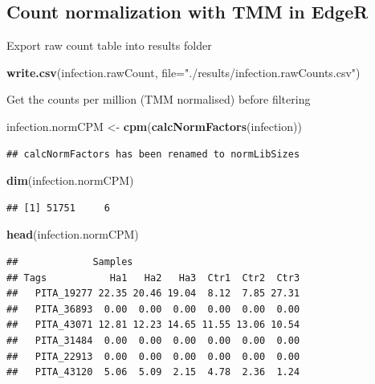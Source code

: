 \documentclass[
]{article}
\newenvironment{Shaded}{\begin{snugshade}}{\end{snugshade}}
\newcommand{\AttributeTok}[1]{\textcolor[rgb]{0.13,0.29,0.53}{#1}}
\newcommand{\FunctionTok}[1]{\textcolor[rgb]{0.13,0.29,0.53}{\textbf{#1}}}
\newcommand{\NormalTok}[1]{#1}
\newcommand{\OtherTok}[1]{\textcolor[rgb]{0.56,0.35,0.01}{#1}}
\newcommand{\StringTok}[1]{\textcolor[rgb]{0.31,0.60,0.02}{#1}}
\begin{document}
\subsection{Count normalization with TMM in
EdgeR}\label{count-normalization-with-tmm-in-edger}

Export raw count table into results folder

\begin{Shaded}
\begin{Highlighting}[]
\FunctionTok{write.csv}\NormalTok{(infection.rawCount, }\AttributeTok{file=}\StringTok{"./results/infection.rawCounts.csv"}\NormalTok{)}
\end{Highlighting}
\end{Shaded}

Get the counts per million (TMM normalised) before filtering

\begin{Shaded}
\begin{Highlighting}[]
\NormalTok{infection.normCPM }\OtherTok{\textless{}{-}} \FunctionTok{cpm}\NormalTok{(}\FunctionTok{calcNormFactors}\NormalTok{(infection))}
\end{Highlighting}
\end{Shaded}

\begin{verbatim}
## calcNormFactors has been renamed to normLibSizes
\end{verbatim}

\begin{Shaded}
\begin{Highlighting}[]
\FunctionTok{dim}\NormalTok{(infection.normCPM)}
\end{Highlighting}
\end{Shaded}

\begin{verbatim}
## [1] 51751     6
\end{verbatim}

\begin{Shaded}
\begin{Highlighting}[]
\FunctionTok{head}\NormalTok{(infection.normCPM)}
\end{Highlighting}
\end{Shaded}

\begin{verbatim}
##             Samples
## Tags           Ha1   Ha2   Ha3  Ctr1  Ctr2  Ctr3
##   PITA_19277 22.35 20.46 19.04  8.12  7.85 27.31
##   PITA_36893  0.00  0.00  0.00  0.00  0.00  0.00
##   PITA_43071 12.81 12.23 14.65 11.55 13.06 10.54
##   PITA_31484  0.00  0.00  0.00  0.00  0.00  0.00
##   PITA_22913  0.00  0.00  0.00  0.00  0.00  0.00
##   PITA_43120  5.06  5.09  2.15  4.78  2.36  1.24
\end{verbatim}
\end{document}
